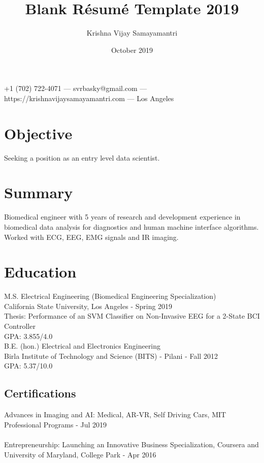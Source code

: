 \documentclass{article}
\makeatletter
\renewcommand{\maketitle}{
\begin{center}
    {\huge\bfseries
    \theauthor}
    
    \vspace{.25em}
    +1 (702) 722-4071 ---
    svrbasky@gmail.com --- https://krishnavijaysamayamantri.com ---
    Los Angeles
    
\end{center}
}
\makeatother
\begin{document}
\title{Blank R\'esum\'e Template 2019}
\author{Krishna Vijay Samayamantri}
\date{October 2019}
\maketitle


\section{Objective}
Seeking a position as an entry level data scientist.

\section{Summary}
Biomedical engineer with 5 years of research and development experience in biomedical data analysis for diagnostics and human machine interface algorithms. Worked with ECG, EEG, EMG signals and IR imaging.

\section{Education}
M.S. Electrical Engineering (Biomedical Engineering Specialization)\\
\noindent    
California State University, Los Angeles \hfill - Spring 2019\\
\noindent    
Thesis: Performance of an SVM Classifier on Non-Invasive EEG for a 2-State BCI Controller \\
\noindent   
GPA: 3.855/4.0\\

\noindent    
B.E. (hon.) Electrical and Electronics Engineering\\
\noindent    
Birla Institute of Technology and Science (BITS) - Pilani \hfill - Fall 2012\\
\noindent    
 GPA: 5.37/10.0


\subsection{Certifications}
Advances in Imaging and AI: Medical, AR-VR, Self Driving Cars, MIT Professional Programs - Jul 2019\\
\\
Entrepreneurship: Launching an Innovative Business Specialization, Coursera and University of Maryland, College Park - Apr 2016
\end{document}
